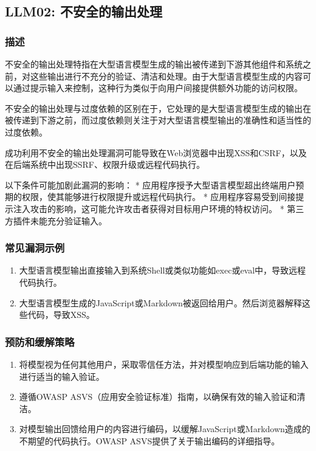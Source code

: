 \documentclass[
]{article}
\author{}
\date{}
\providecommand{\tightlist}{%
  \setlength{\itemsep}{0pt}\setlength{\parskip}{0pt}}
\begin{document}
\subsection{LLM02:
不安全的输出处理}\label{llm02-ux4e0dux5b89ux5168ux7684ux8f93ux51faux5904ux7406}

\subsubsection{描述}\label{ux63cfux8ff0}

不安全的输出处理特指在大型语言模型生成的输出被传递到下游其他组件和系统之前，对这些输出进行不充分的验证、清洁和处理。由于大型语言模型生成的内容可以通过提示输入来控制，这种行为类似于向用户间接提供额外功能的访问权限。

不安全的输出处理与过度依赖的区别在于，它处理的是大型语言模型生成的输出在被传递到下游之前，而过度依赖则关注于对大型语言模型输出的准确性和适当性的过度依赖。

成功利用不安全的输出处理漏洞可能导致在Web浏览器中出现XSS和CSRF，以及在后端系统中出现SSRF、权限升级或远程代码执行。

以下条件可能加剧此漏洞的影响： *
应用程序授予大型语言模型超出终端用户预期的权限，使其能够进行权限提升或远程代码执行。
*
应用程序容易受到间接提示注入攻击的影响，这可能允许攻击者获得对目标用户环境的特权访问。
* 第三方插件未能充分验证输入。

\subsubsection{常见漏洞示例}\label{ux5e38ux89c1ux6f0fux6d1eux793aux4f8b}

\begin{enumerate}
\def\labelenumi{\arabic{enumi}.}
\tightlist
\item
  大型语言模型输出直接输入到系统Shell或类似功能如exec或eval中，导致远程代码执行。
\item
  大型语言模型生成的JavaScript或Markdown被返回给用户。然后浏览器解释这些代码，导致XSS。
\end{enumerate}

\subsubsection{预防和缓解策略}\label{ux9884ux9632ux548cux7f13ux89e3ux7b56ux7565}

\begin{enumerate}
\def\labelenumi{\arabic{enumi}.}
\tightlist
\item
  将模型视为任何其他用户，采取零信任方法，并对模型响应到后端功能的输入进行适当的输入验证。
\item
  遵循OWASP ASVS（应用安全验证标准）指南，以确保有效的输入验证和清洁。
\item
  对模型输出回馈给用户的内容进行编码，以缓解JavaScript或Markdown造成的不期望的代码执行。OWASP
  ASVS提供了关于输出编码的详细指导。
\end{enumerate}
\end{document}
